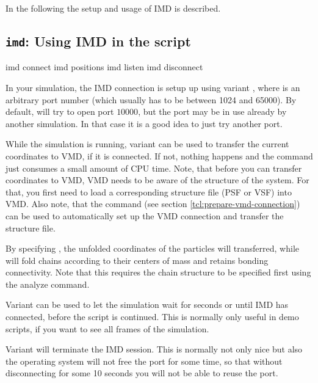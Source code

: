 In the following the setup and usage of IMD is described.

\subsection{\texttt{imd}: Using IMD in the script}

\begin{essyntax}
   imd connect 
   imd positions 
   imd listen 
   imd disconnect
\end{essyntax}

In your simulation, the IMD connection is setup up using variant
, where  is an arbitrary port number (which
usually has to be between 1024 and 65000). By default, \es will try to
open port $10000$, but the port may be in use already by another \es
simulation. In that case it is a good idea to just try another port.

While the simulation is running, variant  can be used to
transfer the current coordinates to VMD, if it is connected.  If not,
nothing happens and the command just consumes a small amount of CPU
time. Note, that before you can transfer coordinates to VMD, VMD needs
to be aware of the structure of the system. For that, you first need
to load a corresponding structure file (PSF or VSF) into VMD. Also
note, that the command  (see section
\vref{tcl:prepare-vmd-connection}) can be used to automatically set up
the VMD connection and transfer the structure file.

By specifying , the unfolded coordinates of the
particles will transferred, while  will fold chains
according to their centers of mass and retains bonding connectivity.
Note that this requires the chain structure to be specified first
using the analyze command.

Variant  can be used to let the simulation wait for
 seconds or until IMD has connected, before the script is
continued. This is normally only useful in demo scripts, if you want
to see all frames of the simulation.

Variant  will terminate the IMD session. This is normally
not only nice but also the operating system will not free the port for
some time, so that without disconnecting for some 10 seconds you will
not be able to reuse the port.

